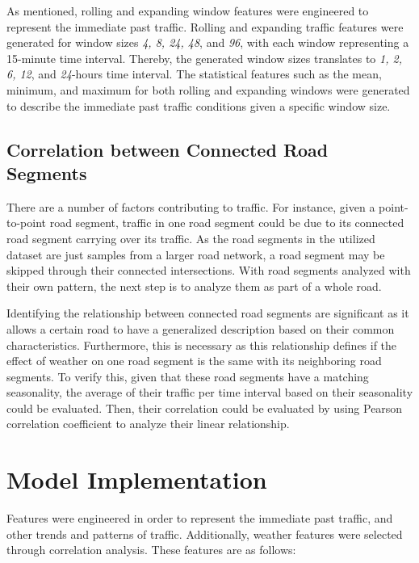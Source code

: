 As mentioned, rolling and expanding window features were engineered to represent the immediate past traffic. Rolling and expanding traffic features were generated for window sizes \textit{4, 8, 24, 48}, and \textit{96}, with each window representing a 15-minute time interval. Thereby, the generated window sizes translates to \textit{1, 2, 6, 12}, and \textit{24}-hours time interval. The statistical features such as the mean, minimum, and maximum for both rolling and expanding windows were generated to describe the immediate past traffic conditions given a specific window size.


\subsection{Correlation between Connected Road Segments}
There are a number of factors contributing to traffic. For instance, given a point-to-point road segment, traffic in one road segment could be due to its connected road segment carrying over its traffic. As the road segments in the utilized dataset are just samples from a larger road network, a road segment may be skipped through their connected intersections. With road segments analyzed with their own pattern, the next step is to analyze them as part of a whole road.

Identifying the relationship between connected road segments are significant as it allows a certain road to have a generalized description based on their common characteristics. Furthermore, this is necessary as this relationship defines if the effect of weather on one road segment is the same with its neighboring road segments. To verify this, given that these road segments have a matching seasonality, the average of their traffic per time interval based on their seasonality could be evaluated. Then, their correlation could be evaluated by using Pearson correlation coefficient to analyze their linear relationship.




\section{Model Implementation}
Features were engineered in order to represent the immediate past traffic, and other trends and patterns of traffic. Additionally, weather features were selected through correlation analysis. These features are as follows:

